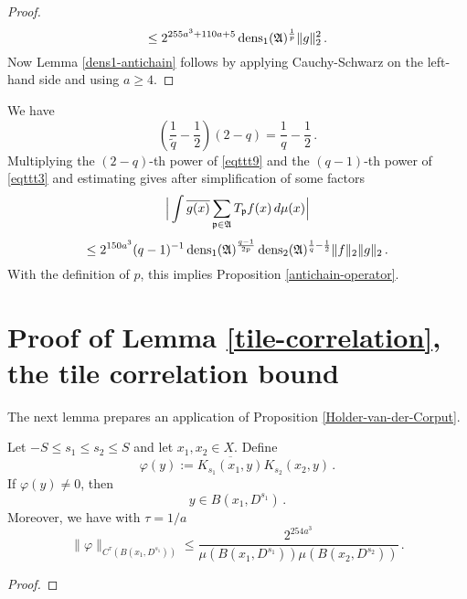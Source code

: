 {\begin{proof}
\begin{equation}
    \le  2^{255a^3+110a + 5} \operatorname{\operatorname{dens}}_1(\mathfrak{A})^{\frac 1p}
    \|g\|_2^2\,.
\end{equation}
Now Lemma \ref{dens1-antichain} follows by applying Cauchy-Schwarz on the left-hand side and using
$a\ge 4$.
\end{proof}
We have
\begin{equation}
    \left (\frac 1{\tilde{q}} -\frac 12\right) (2-q)= \frac 1q -\frac 12\,.
\end{equation}
Multiplying  the $(2-q)$-th power of  \eqref{eqttt9} and the $(q-1)$-th power of \eqref{eqttt3}
and estimating gives after simplification of some factors
\begin{equation}\label{eqttt8}
    \Big|\int \overline{g(x)} \sum_{{\mathfrak p} \in \mathfrak{A}} T_{{\mathfrak p}} f(x)\, d\mu(x)\Big|
\end{equation}
 \begin{equation}
    \le  2^{150a^3}({q}-1)^{-1} \operatorname{\operatorname{dens}}_1(\mathfrak{A})^{\frac {q-1}{2p}}\operatorname{\operatorname{dens}}_2(\mathfrak{A})^{\frac 1{q}-\frac 12}  \|f\|_2\|g\|_2\, .
\end{equation}
With the definition of $p$, this  implies
Proposition \ref{antichain-operator}.


\section{Proof of Lemma \ref{tile-correlation}, the tile correlation bound }\label{sec-tile-operator}

The next lemma prepares an application of
Proposition \ref{Holder-van-der-Corput}.
\begin{lemma}\label{correlation-kernel-bound}
Let $-S\le s_1\le s_2\le S$ and let $x_1,x_2\in X$.
Define \begin{equation}
 \varphi(y) :=  \overline{K_{s_1}(x_1, y)}
 K_{s_2}(x_2, y) \, .
\end{equation}
If $\varphi(y)\neq 0$, then
\begin{equation}\label{eqt10}
    y\in B(x_1, D^{s_1})\, .
\end{equation}
Moreover, we have with $\tau = 1/a$
\begin{equation}\label{eqt11}
  \|\varphi\|_{C^\tau(B(x_1, D^{s_1}))}\le
\frac{2^{254 a^3}}{\mu(B(x_1, D^{s_1}))\mu(B(x_2, D^{s_2}))}
      \, .
\end{equation}

\end{lemma}
\begin{proof}


\end{proof}}
